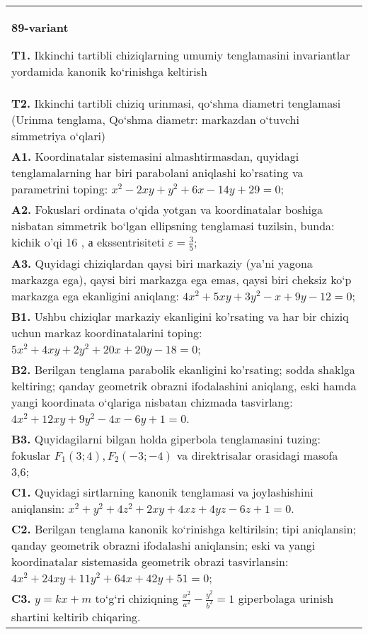 \documentclass{article}
\begin{document}
\begin{tabular}{m{17cm}}
\textbf{89-variant}
\newline

\textbf{T1.} Ikkinchi tartibli chiziqlarning umumiy tenglamasini invariantlar yordamida kanonik ko‘rinishga keltirish \\
\textbf{T2.} Ikkinchi tartibli chiziq urinmasi, qo‘shma diametri tenglamasi (Urinma tenglama, Qo‘shma diametr: markazdan o‘tuvchi simmetriya o‘qlari) \\
\textbf{A1.} Koordinatalar sistemasini almashtirmasdan, quyidagi tenglamalarning har biri parabolani aniqlashi ko'rsating va parametrini toping: $x^2-2 x y+y^2+6 x-14 y+29=0$; \\
\textbf{A2.} Fokuslari ordinata o‘qida yotgan va koordinatalar boshiga nisbatan simmetrik bo‘lgan ellipsning tenglamasi tuzilsin, bunda: kichik o'qi 16 , а ekssentrisiteti $\varepsilon=\frac{3}{5}$; \\
\textbf{A3.} Quyidagi chiziqlardan qaysi biri markaziy (ya’ni yagona markazga ega), qaysi biri markazga ega emas, qaysi biri cheksiz ko‘p markazga ega ekanligini aniqlang: $4 x^2+5 x y+3 y^2-x+9 y-12=0$; \\
\textbf{B1.} Ushbu chiziqlar markaziy ekanligini ko'rsating va har bir chiziq uchun markaz koordinatalarini toping: $5 x^2+4 x y+2 y^2+20 x+20 y-18=0$; \\
\textbf{B2.} Berilgan tenglama parabolik ekanligini ko'rsating; sodda shaklga keltiring; qanday geometrik obrazni ifodalashini aniqlang, eski hamda yangi koordinata o‘qlariga nisbatan chizmada tasvirlang: $4 x^2+12 x y+9 y^2-4 x-6 y+1=0$. \\
\textbf{B3.} Quyidagilarni bilgan holda giperbola tenglamasini tuzing: fokuslar $F_1 (3; 4), F_2 (-3;-4)$ va direktrisalar orasidagi masofa 3,6; \\
\textbf{C1.} Quyidagi sirtlarning kanonik tenglamasi va joylashishini aniqlansin: $x^2+y^2+4 z^2+2 x y+4 x z+4 y z-6 z+1=0$. \\
\textbf{C2.} Berilgan tenglama kanonik ko‘rinishga keltirilsin; tipi aniqlansin; qanday geometrik obrazni ifodalashi aniqlansin; eski va yangi koordinatalar sistemasida geometrik obrazi tasvirlansin: $4 x^2+24 x y+11 y^2+64 x+42 y+51=0$; \\
\textbf{C3.} $y=k x+m$ to‘g‘ri chiziqning $\frac{x^2}{a^2}-\frac{y^2}{b^2}=1$ giperbolaga urinish shartini keltirib chiqaring. \\

\end{tabular}
\vspace{1cm}
\end{document}
